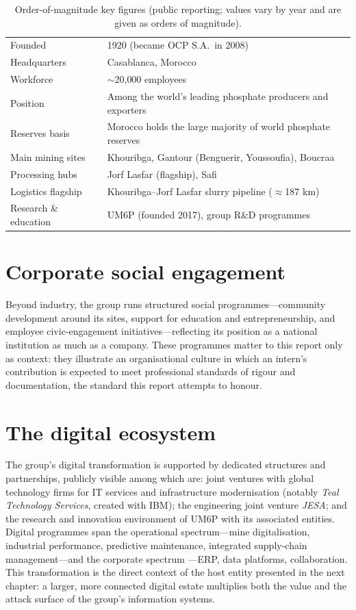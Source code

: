 \documentclass[11pt,a4paper]{report}
\begin{document}
\begin{table}[H]
\centering
\caption{Order-of-magnitude key figures (public reporting; values vary by
year and are given as orders of magnitude).}
\label{tab:ocp-figures}
\small
\renewcommand{\arraystretch}{1.25}
\begin{tabular}{@{}l l@{}}
\toprule
Founded & 1920 (became OCP S.A.\ in 2008) \\
Headquarters & Casablanca, Morocco \\
Workforce & $\sim$20{,}000 employees \\
Position & Among the world's leading phosphate producers and exporters \\
Reserves basis & Morocco holds the large majority of world phosphate
reserves \\
Main mining sites & Khouribga, Gantour (Benguerir, Youssoufia), Boucraa \\
Processing hubs & Jorf Lasfar (flagship), Safi \\
Logistics flagship & Khouribga--Jorf Lasfar slurry pipeline
($\approx$187 km) \\
Research \& education & UM6P (founded 2017), group R\&D programmes \\
\bottomrule
\end{tabular}
\end{table}

\section{Corporate social engagement}
Beyond industry, the group runs structured social programmes---community
development around its sites, support for education and entrepreneurship,
and employee civic-engagement initiatives---reflecting its position as a
national institution as much as a company. These programmes matter to this
report only as context: they illustrate an organisational culture in which
an intern's contribution is expected to meet professional standards of
rigour and documentation, the standard this report attempts to honour.

\section{The digital ecosystem}
The group's digital transformation is supported by dedicated structures and
partnerships, publicly visible among which are: joint ventures with global
technology firms for IT services and infrastructure modernisation (notably
\emph{Teal Technology Services}, created with IBM); the engineering joint
venture \emph{JESA}; and the research and innovation environment of UM6P
with its associated entities. Digital programmes span the operational
spectrum---mine digitalisation, industrial performance, predictive
maintenance, integrated supply-chain management---and the corporate spectrum
---ERP, data platforms, collaboration. This transformation is the direct
context of the host entity presented in the next chapter: a larger, more
connected digital estate multiplies both the value and the attack surface of
the group's information systems.
\end{document}
